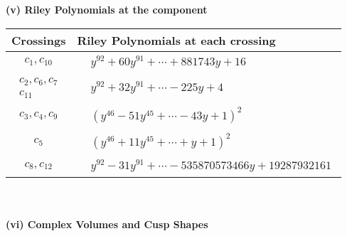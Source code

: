 \documentclass[1p]{elsarticle_modified}
\theoremstyle{definition}
\begin{document}
\newpage\renewcommand{\arraystretch}{1}
\flushleft \textbf{(v) Riley Polynomials at the component}\newline \\
\begin{tabular}{m{50pt}|m{274pt}}
Crossings & \hspace{64pt}Riley Polynomials at each crossing \\
\hline $$\begin{aligned}c_{1},c_{10}\end{aligned}$$&$\begin{aligned}
&y^{92}+60 y^{91}+\cdots+881743 y+16
\end{aligned}$\\
\hline $$\begin{aligned}c_{2},c_{6},c_{7}\\c_{11}\end{aligned}$$&$\begin{aligned}
&y^{92}+32 y^{91}+\cdots-225 y+4
\end{aligned}$\\
\hline $$\begin{aligned}c_{3},c_{4},c_{9}\end{aligned}$$&$\begin{aligned}
&(y^{46}-51 y^{45}+\cdots-43 y+1)^{2}
\end{aligned}$\\
\hline $$\begin{aligned}c_{5}\end{aligned}$$&$\begin{aligned}
&(y^{46}+11 y^{45}+\cdots+y+1)^{2}
\end{aligned}$\\
\hline $$\begin{aligned}c_{8},c_{12}\end{aligned}$$&$\begin{aligned}
&y^{92}-31 y^{91}+\cdots-535870573466 y+19287932161
\end{aligned}$\\
\hline
\end{tabular}\\~\\
\newpage\flushleft \textbf{(vi) Complex Volumes and Cusp Shapes}
\end{document}
